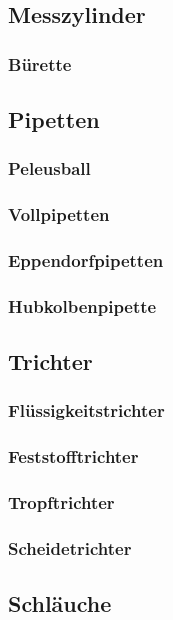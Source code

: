 \subsection{Messzylinder}


\subsubsection{Bürette}


\subsection{Pipetten}
\subsubsection{Peleusball}
\subsubsection{Vollpipetten}
\subsubsection{Eppendorfpipetten}
\subsubsection{Hubkolbenpipette}

\subsection{Trichter}
\subsubsection{Flüssigkeitstrichter}
\subsubsection{Feststofftrichter}
\subsubsection{Tropftrichter}
\subsubsection{Scheidetrichter}

\subsection{Schläuche}
